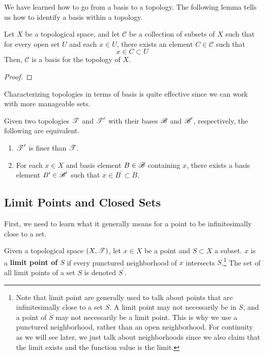   We have learned how to go from a basis to a topology. The following lemma tells us how to identify a basis within a topology. 

  \begin{theorem}
    Let $X$ be a topological space, and let $\mathscr{C}$ be a collection of subsets of $X$ such that for every open set $U$ and each $x \in U$, there exists an element $C \in \mathscr{C}$ such that
    \begin{equation}
      x \in C \subset U
    \end{equation}
    Then, $\mathscr{C}$ is a basis for the topology of $X$. 
  \end{theorem}
  \begin{proof}
    
  \end{proof} 

  Characterizing topologies in terms of basis is quite effective since we can work with more manageable sets. 

  \begin{lemma}
    Given two topologies $\operatorname{\mathscr{T}}$ and $\operatorname{\mathscr{T}}^\prime$ with their bases $\operatorname{\mathscr{B}}$ and $\operatorname{\mathscr{B}}^\prime$, respectively, the following are equivalent. 
    \begin{enumerate}
      \item $\operatorname{\mathscr{T}}^\prime$ is finer than $\operatorname{\mathscr{T}}$. 
      \item For each $x \in X$ and basis element $B \in \operatorname{\mathscr{B}}$ containing $x$, there exists a basis element $B^\prime \in \operatorname{\mathscr{B}}^\prime$ such that $x \in B^\prime \subset B$. 
    \end{enumerate}
  \end{lemma}
 
\subsection{Limit Points and Closed Sets} 

  First, we need to learn what it generally means for a point to be infinitesimally close to a set. 

  \begin{definition}
    Given a topological space $(X, \operatorname{\mathscr{T}})$, let $x \in X$ be a point and $S \subset X$ a subset. $x$ is a \textbf{limit point of $S$} if every punctured neighborhood of $x$ intersects $S$.\footnote{Note that limit point are generally used to talk about points that are infinitesimally close to a set $S$. A limit point may not necessarily be in $S$, and a point of $S$ may not necessarily be a limit point. This is why we use a punctured neighborhood, rather than an open neighborhood. For continuity as we will see later, we just talk about neighborhoods since we also claim that the limit exists and the function value is the limit.} The set of all limit points of a set $S$ is denoted $S^\prime$.  
  \end{definition} 

